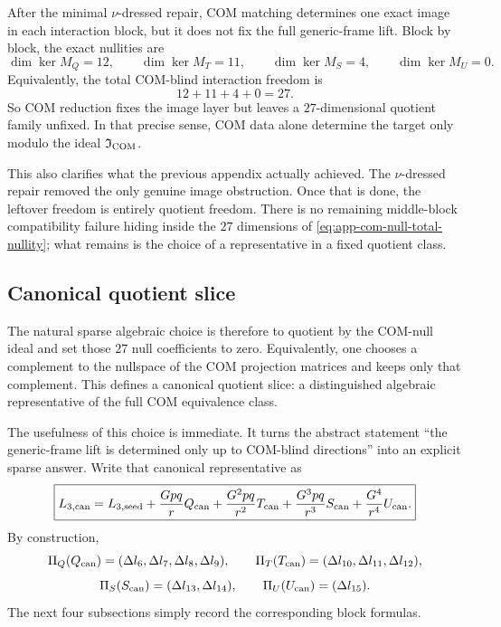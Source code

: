 \documentclass[11pt]{article}
\begin{document}
After the minimal $\nu$-dressed repair, COM matching determines one exact image
in each interaction block, but it does not fix the full generic-frame lift.
Block by block, the exact nullities are
\begin{equation}
\boxed{
\dim\ker M_Q=12,
\qquad
\dim\ker M_T=11,
\qquad
\dim\ker M_S=4,
\qquad
\dim\ker M_U=0.}
\label{eq:app-com-null-block-nullities}
\end{equation}
Equivalently, the total COM-blind interaction freedom is
\begin{equation}
\boxed{12+11+4+0=27.}
\label{eq:app-com-null-total-nullity}
\end{equation}
So COM reduction fixes the image layer but leaves a $27$-dimensional quotient
family unfixed.  In that precise sense, COM data alone determine the target
only modulo the ideal $\mathfrak I_{\rm COM}$.

This also clarifies what the previous appendix actually achieved.  The
$\nu$-dressed repair removed the only genuine image obstruction.  Once that is
done, the leftover freedom is entirely quotient freedom.  There is no remaining
middle-block compatibility failure hiding inside the $27$ dimensions of
\eqref{eq:app-com-null-total-nullity}; what remains is the choice of a
representative in a fixed quotient class.

\subsection{Canonical quotient slice}
\label{app:com-null-slice}

The natural sparse algebraic choice is therefore to quotient by the COM-null
ideal and set those $27$ null coefficients to zero.  Equivalently, one chooses
a complement to the nullspace of the COM projection matrices and keeps only that
complement.  This defines a canonical quotient slice: a distinguished algebraic
representative of the full COM equivalence class.

The usefulness of this choice is immediate.  It turns the abstract statement
``the generic-frame lift is determined only up to COM-blind directions'' into an
explicit sparse answer.  Write that canonical representative as
\begin{equation}
\boxed{
L_{3,\rm can}
=
L_{3,\rm seed}
+\frac{Gpq}{r}Q_{\rm can}
+\frac{G^2pq}{r^2}T_{\rm can}
+\frac{G^3pq}{r^3}S_{\rm can}
+\frac{G^4}{r^4}U_{\rm can}.}
\label{eq:app-com-null-L3can}
\end{equation}
By construction,
\begin{equation}
\Pi_Q(Q_{\rm can})=(\Delta l_6,\Delta l_7,\Delta l_8,\Delta l_9),
\qquad
\Pi_T(T_{\rm can})=(\Delta l_{10},\Delta l_{11},\Delta l_{12}),
\label{eq:app-com-null-projection-QT}
\end{equation}
\begin{equation}
\Pi_S(S_{\rm can})=(\Delta l_{13},\Delta l_{14}),
\qquad
\Pi_U(U_{\rm can})=(\Delta l_{15}).
\label{eq:app-com-null-projection-SU}
\end{equation}
The next four subsections simply record the corresponding block formulas.
\end{document}
